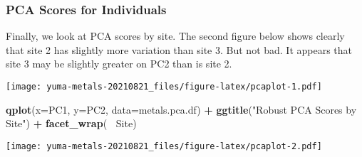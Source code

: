 \documentclass[]{article}
\newenvironment{Shaded}{\begin{snugshade}}{\end{snugshade}}
\newcommand{\CommentTok}[1]{\textcolor[rgb]{0.56,0.35,0.01}{\textit{#1}}}
\newcommand{\DataTypeTok}[1]{\textcolor[rgb]{0.13,0.29,0.53}{#1}}
\newcommand{\KeywordTok}[1]{\textcolor[rgb]{0.13,0.29,0.53}{\textbf{#1}}}
\newcommand{\NormalTok}[1]{#1}
\newcommand{\OperatorTok}[1]{\textcolor[rgb]{0.81,0.36,0.00}{\textbf{#1}}}
\newcommand{\StringTok}[1]{\textcolor[rgb]{0.31,0.60,0.02}{#1}}
\begin{document}
\hypertarget{pca-scores-for-individuals}{%
\subsubsection{PCA Scores for
Individuals}\label{pca-scores-for-individuals}}

Finally, we look at PCA scores by site. The second figure below shows
clearly that site 2 has slightly more variation than site 3. But not
bad. It appears that site 3 may be slightly greater on PC2 than is site
2.

\begin{Shaded}
\end{Shaded}

\texttt{[image: yuma-metals-20210821\_files/figure-latex/pcaplot-1.pdf]}

\begin{Shaded}
\begin{Highlighting}[]
\KeywordTok{qplot}\NormalTok{(}\DataTypeTok{x=}\NormalTok{PC1, }\DataTypeTok{y=}\NormalTok{PC2, }\DataTypeTok{data=}\NormalTok{metals.pca.df) }\OperatorTok{+}\StringTok{ }\KeywordTok{ggtitle}\NormalTok{(}\StringTok{"Robust PCA Scores by Site"}\NormalTok{) }\OperatorTok{+}
\StringTok{    }\KeywordTok{facet_wrap}\NormalTok{(}\OperatorTok{~}\StringTok{ }\NormalTok{Site)}
\end{Highlighting}
\end{Shaded}

\texttt{[image: yuma-metals-20210821\_files/figure-latex/pcaplot-2.pdf]}

\begin{Shaded}
\end{Shaded}
\end{document}
